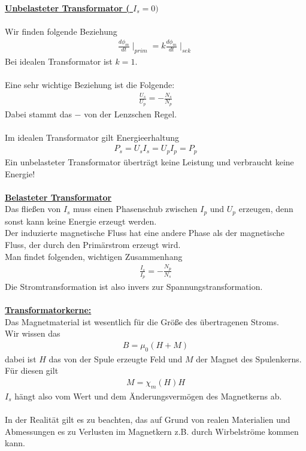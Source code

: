 \documentclass[a4paper,12pt]{report}
\begin{document}
\underline{\textbf{Unbelasteter Transformator ( $I_s = 0 ) $}} \\ \\
Wir finden folgende Beziehung 
\begin{align}
\frac{d\phi_m}{dt} \mid_{prim} = k \frac{d\phi_m}{dt} \mid_{sek} 
\end{align}
Bei idealen Transformator ist $k = 1$. \\ \\
Eine sehr wichtige Beziehung ist die Folgende: 
\begin{align}
\frac{U_s}{U_p} = - \frac{N_s}{N_p}
\end{align}
Dabei stammt das $-$ von der Lenzschen Regel. \\\\
Im idealen Transformator gilt Energieerhaltung 
\begin{align}
P_s = U_sI_s = U_pI_p = P_p
\end{align}
Ein unbelasteter Transformator überträgt keine Leistung und verbraucht keine Energie! \\\\
\underline{\textbf{Belasteter Transformator}} \\
Das fließen von $I_s$ muss einen Phasenschub zwischen $ I_p $ und $U_p$  erzeugen, denn sonst kann keine Energie erzeugt werden. \\
Der induzierte magnetische Fluss hat eine andere Phase als der magnetische Fluss, der durch den Primärstrom erzeugt wird. \\
Man findet folgenden, wichtigen Zusammenhang 
\begin{align}
\frac{I_s}{I_p} = - \frac{N_p}{N_s}
\end{align}
Die Stromtransformation ist also invers zur Spannungstransformation. \\\\
\underline{\textbf{Transformatorkerne:}}\\
Das Magnetmaterial ist wesentlich für die Größe des übertragenen Stroms. \\
Wir wissen das 
\begin{align}
B = \mu_0 (H + M)
\end{align}
dabei ist $H$ das von der Spule erzeugte Feld und $M$ der Magnet des Spulenkerns. Für diesen gilt
\begin{align}
M = \chi_m(H)H
\end{align}
$I_s$ hängt also vom Wert und dem Änderungsvermögen des Magnetkerns ab. \\\\
In der Realität gilt es zu beachten, das auf Grund von realen Materialien und Abmessungen es zu Verlusten im Magnetkern z.B. durch Wirbelströme kommen kann.
\end{document}
